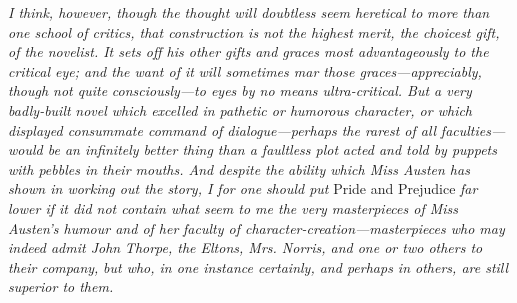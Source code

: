 \documentclass[12pt,openright]{book}
\begin{document}
\textit{I think, however, though the thought will doubtless seem heretical to}\textit{ }\textit{more than one school of critics, that construction is not the highest}\textit{ }\textit{merit, the choicest gift, of the novelist. It sets off his other gifts}\textit{ }\textit{and graces most advantageously to the critical eye; and the want of it}\textit{ }\textit{will sometimes mar those graces—appreciably, though not quite}\textit{ }\textit{consciously—to eyes by no means ultra-critical. But a very badly-built}\textit{ }\textit{novel which excelled in pathetic or humorous character, or which}\textit{ }\textit{displayed consummate command of dialogue—perhaps the rarest of all}\textit{ }\textit{faculties—would be an infinitely better thing than a faultless plot}\textit{ }\textit{acted and told by puppets with pebbles in their mouths. And despite the}\textit{ }\textit{ability which Miss Austen has shown in working out the story, I for one}\textit{ }\textit{should put} Pride and Prejudice \textit{far lower if it did not contain what}\textit{ }\textit{seem to me the very masterpieces of Miss Austen’s humour and of her}\textit{ }\textit{faculty of character-creation—masterpieces who may indeed admit John}\textit{ }\textit{Thorpe, the Eltons, Mrs. Norris, and one or two others to their company,}\textit{ }\textit{but who, in one instance certainly, and perhaps in others, are still}\textit{ }\textit{superior to them.}
\end{document}
